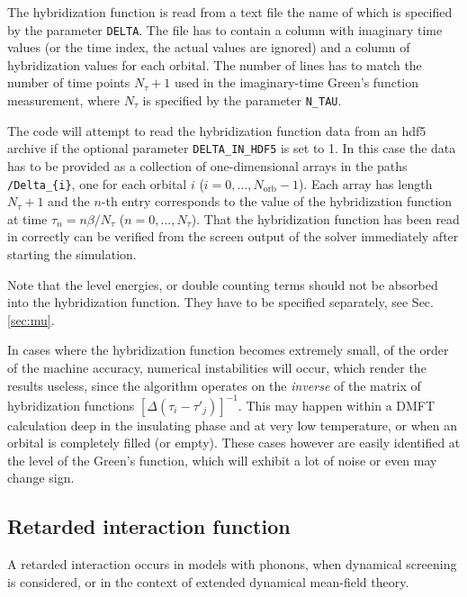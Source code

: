 \documentclass[aps,prb,floatfix,superscriptaddress,twocolumn,notitlepage]{revtex4-1}
\begin{document}
The hybridization function is read from a text file the name of which is specified by the parameter \verb#DELTA#. The file has to contain a column with imaginary time values (or the time index, the actual values are ignored) and a column of hybridization values for each orbital. The number of lines has to match the number of time points $N_{\tau}+1$ used in the imaginary-time Green's function measurement, where $N_{\tau}$ is specified by the parameter \verb#N_TAU#.

The code will attempt to read the hybridization function data from an hdf5 archive if the optional parameter \verb#DELTA_IN_HDF5# is set to 1. In this case the data has to be provided as a collection of one-dimensional arrays in the paths \verb#/Delta_{i}#, one for each orbital $i$ ($i=0,\ldots,N_{\text{orb}}-1$). Each array has length $N_{\tau}+1$ and the $n$-th entry corresponds to the value of the hybridization function at time $\tau_{n}=n\beta/N_{\tau}$ ($n=0,\ldots,N_{\tau}$).
That the hybridization function has been read in correctly can be verified from the screen output of the solver immediately after starting the simulation.

Note that the level energies, or double counting terms should not be absorbed into the hybridization function. They have to be specified separately, see Sec. \ref{sec:mu}.

In cases where the hybridization function becomes extremely small, of the order of the machine accuracy, numerical instabilities will occur, which render the results useless, since the algorithm operates on the \emph{inverse} of the matrix of hybridization functions $[\Delta(\tau_{i}-\tau'_{j})]^{-1}$.
This may happen within a DMFT calculation deep in the insulating phase and at very low temperature, or when an orbital is completely filled (or empty).
These cases however are easily identified at the level of the Green's function, which will exhibit a lot of noise or even may change sign.

\subsection{Retarded interaction function}
\label{k_ret_int}
A retarded interaction occurs in models with phonons, when dynamical screening is considered, or in the context of extended dynamical mean-field theory.
\end{document}
